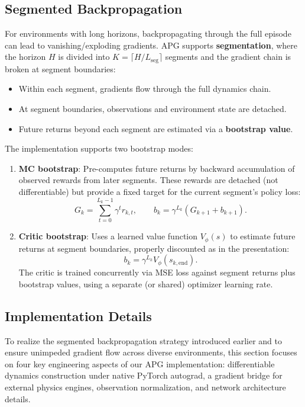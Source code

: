 \documentclass[11pt,a4paper]{article}
\begin{document}
\subsection{Segmented Backpropagation}
\label{sec:segmentation}

For environments with long horizons, backpropagating through the full episode can lead to vanishing/exploding gradients. APG supports \textbf{segmentation}, where the horizon $H$ is divided into $K=\lceil H/L_{\mathrm{seg}}\rceil$ segments and the gradient chain is broken at segment boundaries:
\begin{itemize}
  \item Within each segment, gradients flow through the full dynamics chain.
  \item At segment boundaries, observations and environment state are detached.
  \item Future returns beyond each segment are estimated via a \textbf{bootstrap value}.
\end{itemize}

The implementation supports two bootstrap modes:

\begin{enumerate}
  \item \textbf{MC bootstrap}: Pre-computes future returns by backward accumulation of observed rewards from later segments. These rewards are detached (not differentiable) but provide a fixed target for the current segment's policy loss:
  \[
    G_k = \sum_{t=0}^{L_k-1}\gamma^t r_{k,t}, \qquad
    b_k = \gamma^{L_k}(G_{k+1}+b_{k+1}) .
  \]

  \item \textbf{Critic bootstrap}: Uses a learned value function $V_\phi(s)$ to estimate future returns at segment boundaries, properly discounted as in the presentation:
  \[
    b_k = \gamma^{L_k} V_\phi(s_{k,\mathrm{end}}).
  \]
  The critic is trained concurrently via MSE loss against segment returns plus bootstrap values, using a separate (or shared) optimizer learning rate.
\end{enumerate}

\subsection{Implementation Details}
\label{sec:implementation}
To realize the segmented backpropagation strategy introduced earlier and to ensure unimpeded gradient flow across diverse environments, this section focuses on four key engineering aspects of our APG implementation: differentiable dynamics construction under native PyTorch autograd, a gradient bridge for external physics engines, observation normalization, and network architecture details. 
\end{document}
